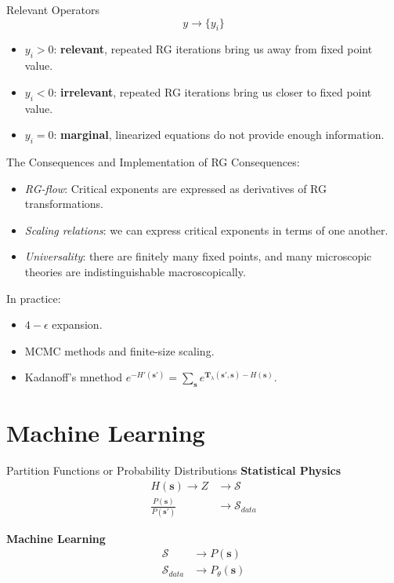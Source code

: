 \documentclass{beamer}
\newcommand{\bolds}[1]{\boldsymbol{#1}}
\newcommand{\mcS}{\mathcal{S}}
\newcommand{\bs}{\bolds{s}}
\newcommand{\bT}{\bolds{T}}
\renewcommand{\l}{\lambda}
\begin{document}
\begin{frame}{Relevant Operators}
  \begin{equation*}%
    \boxed{y\rightarrow \{y_i\}}
  \end{equation*}%
  \begin{itemize}
  \item $y_i > 0$: \textbf{relevant}, repeated RG iterations bring us
    away from fixed point value.
  \item $y_i < 0$: \textbf{irrelevant}, repeated RG iterations bring
    us closer to fixed point value.
  \item $y_i = 0$: \textbf{marginal}, linearized equations do not
    provide enough information.
  \end{itemize}
\end{frame}

\begin{frame}{The Consequences and Implementation of RG}
  Consequences:
  \begin{itemize}
  \item \textit{RG-flow}: Critical exponents are expressed as
    derivatives of RG transformations.
  \item \textit{Scaling relations}: we can express critical exponents
    in terms of one another.
  \item \textit{Universality}: there are finitely many fixed points,
    and many microscopic theories are indistinguishable
    macroscopically.
  \end{itemize}
  In practice:
  \begin{itemize}
  \item $4-\epsilon$ expansion.
  \item MCMC methods and finite-size scaling.
  \item Kadanoff's mnethod
    $e^{-H'(\bs')}=\sum_{\bs} e^{\bT_\l(\bs',\bs)-H(\bs)}$.
  \end{itemize}

\end{frame}

\section{Machine Learning}
\begin{frame}{Partition Functions or Probability Distributions}
  \textbf{Statistical Physics}
  \begin{align}%
    H(\bs)\rightarrow Z &\rightarrow \mcS\\
    \frac{P(\bs)}{P(\bs')}&\rightarrow \mcS_{data}
  \end{align}%

  \textbf{Machine Learning}
  \begin{align}%
    \mcS&\rightarrow P(\bs)\\
    \mcS_{data}&\rightarrow P_{\theta}(\bs)
  \end{align}%

\end{frame}
\end{document}
